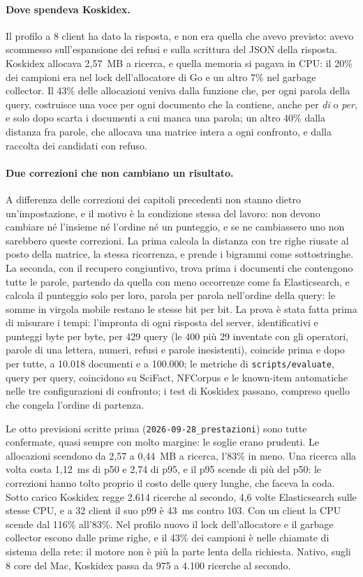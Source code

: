 \paragraph{Dove spendeva Koskidex.} Il profilo a 8 client ha dato la risposta, e
non era quella che avevo previsto: avevo scommesso sull'espansione dei refusi e
sulla scrittura del JSON della risposta. Koskidex allocava 2,57~MB a ricerca, e
quella memoria si pagava in CPU: il 20\% dei campioni era nel lock
dell'allocatore di Go e un altro 7\% nel garbage collector. Il 43\% delle
allocazioni veniva dalla funzione che, per ogni parola della query, costruisce
una voce per ogni documento che la contiene, anche per \emph{di} o \emph{per},
e solo dopo scarta i documenti a cui manca una parola; un altro 40\% dalla
distanza fra parole, che allocava una matrice intera a ogni confronto, e dalla
raccolta dei candidati con refuso.

\paragraph{Due correzioni che non cambiano un risultato.} A differenza delle
correzioni dei capitoli precedenti non stanno dietro un'impostazione, e il
motivo è la condizione stessa del lavoro: non devono cambiare né l'insieme né l'ordine né un
punteggio, e se ne cambiassero uno non sarebbero queste correzioni. La prima
calcola la distanza con tre righe riusate al posto della matrice, la stessa
ricorrenza, e prende i bigrammi come sottostringhe. La seconda, con il recupero
congiuntivo, trova prima i documenti che contengono tutte le parole, partendo
da quella con meno occorrenze come fa Elasticsearch, e calcola il punteggio
solo per loro, parola per parola nell'ordine della query: le somme in virgola
mobile restano le stesse bit per bit. La prova è stata fatta prima di misurare
i tempi: l'impronta di ogni risposta del server, identificativi e punteggi
byte per byte, per 429 query (le 400 più 29 inventate con gli operatori, parole
di una lettera, numeri, refusi e parole inesistenti), coincide prima e dopo
per tutte, a 10.018 documenti e a 100.000; le metriche di
\texttt{scripts/evaluate}, query per query, coincidono su SciFact, NFCorpus e le
known-item automatiche nelle tre configurazioni di confronto; i test di
Koskidex passano, compreso quello che congela l'ordine di partenza.

Le otto previsioni scritte prima (\texttt{2026-09-28\_prestazioni}) sono tutte
confermate, quasi sempre con molto margine: le soglie erano prudenti. Le
allocazioni scendono da 2,57 a 0,44~MB a ricerca, l'83\% in meno. Una ricerca
alla volta costa 1,12~ms di p50 e 2,74 di p95, e il p95 scende di più del p50:
le correzioni hanno tolto proprio il costo delle query lunghe, che faceva la
coda. Sotto carico Koskidex regge 2.614 ricerche al secondo, 4,6 volte
Elasticsearch sulle stesse CPU, e a 32 client il suo p99 è 43~ms contro 103.
Con un client la CPU scende dal 116\% all'83\%. Nel profilo nuovo il lock
dell'allocatore e il garbage collector escono dalle prime righe, e il 43\% dei
campioni è nelle chiamate di sistema della rete: il motore non è più la parte
lenta della richiesta. Nativo, sugli 8 core del Mac, Koskidex passa da 975 a
4.100 ricerche al secondo.

